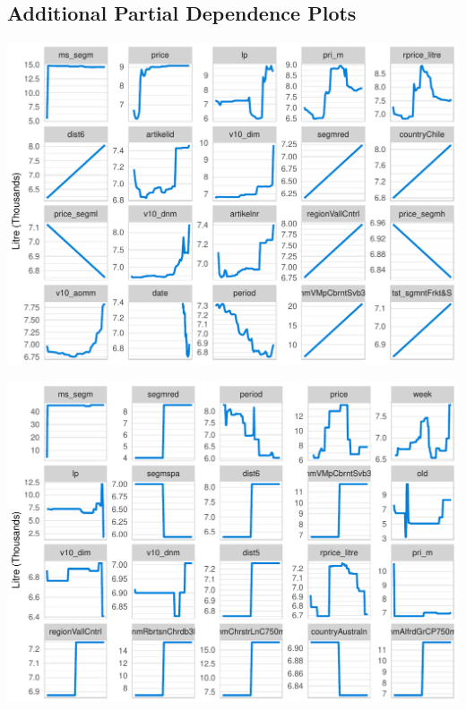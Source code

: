 \documentclass[11pt,]{article}
\let\origfigure\figure
\let\endorigfigure\endfigure
\renewenvironment{figure}[1][2] {
    \expandafter\origfigure\expandafter[H]
} {
    \endorigfigure
}
\begin{document}
\hypertarget{additional-partial-dependence-plots}{%
\subsection{\texorpdfstring{Additional Partial Dependence Plots
\label{chap:ap2}}{Additional Partial Dependence Plots }}\label{additional-partial-dependence-plots}}

\begin{figure}
\centering
\includegraphics{../00_data/output_paper/11_par_dep_random_forest_other.pdf}
\caption{\label{fig:rfpardep_other}Random Forest: Partial Dependence
Plots.}
\end{figure}

\begin{figure}
\centering
\includegraphics{../00_data/output_paper/16_pdp_boosting_main.pdf}
\caption{\label{fig:bgpardep_main}Boosting: Partial Dependence Plots.}
\end{figure}
\end{document}
